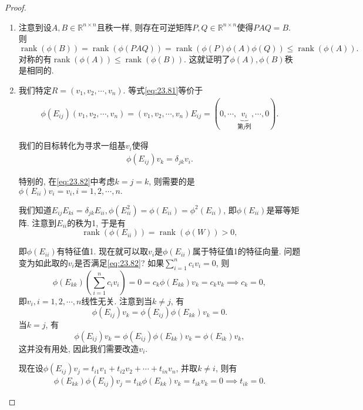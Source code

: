 \documentclass[../../main.tex]{subfiles}
\begin{document}
\begin{proof}
\begin{enumerate}[(1)]
\item 注意到设$A,B \in \mathbb{R}^{n \times n}$且秩一样, 则存在可逆矩阵$P,Q \in \mathbb{R}^{n \times n}$使得$PAQ = B$. 则
$\operatorname{rank}(\phi(B)) = \operatorname{rank}(\phi(PAQ)) = \operatorname{rank}(\phi(P)\phi(A)\phi(Q)) \leq \operatorname{rank}(\phi(A)).$
对称的有$\operatorname{rank}(\phi(A)) \leq \operatorname{rank}(\phi(B))$. 这就证明了$\phi(A),\phi(B)$秩是相同的.

\item 我们特定$R = (v_1,v_2,\cdots,v_n)$. 等式\eqref{eq:23.81}等价于
\begin{align*}
\phi (E_{ij})(v_1,v_2,\cdots ,v_n)=(v_1,v_2,\cdots ,v_n)E_{ij}=\left( 0,\cdots ,\underset{\text{第}j\text{列}}{\underbrace{v_i}},\cdots ,0 \right) .
\end{align*}

我们的目标转化为寻求一组基$v_i$使得
\begin{align}
\phi(E_{ij})v_k = \delta_{jk}v_i. \label{eq:23.82}
\end{align}

特别的, 在\eqref{eq:23.82}中考虑$k = j = k$, 则需要的是
$\phi(E_{ii})v_i = v_i, i = 1,2,\cdots,n.$

我们知道$E_{ij}E_{ki} = \delta_{jk}E_{ii}, \phi(E_{ii}^2) = \phi(E_{ii}) = \phi^2(E_{ii})$, 即$\phi(E_{ii})$是幂等矩阵. 注意到$E_{ii}$的秩为1, 于是有
$$\operatorname{rank}(\phi(E_{ii})) = \operatorname{rank}(\phi(W)) > 0,$$

即$\phi(E_{ii})$有特征值1. 现在就可以取$v_i$是$\phi(E_{ii})$属于特征值1的特征向量. 问题变为如此取的$v_i$是否满足\eqref{eq:23.82}?
如果$\sum_{i=1}^n c_i v_i = 0$, 则
$$\phi(E_{kk})\left(\sum_{i=1}^n c_i v_i\right) = 0 = c_k \phi(E_{kk})v_k = c_k v_k \implies c_k = 0,$$
即$v_i, i = 1,2,\cdots,n$线性无关.
注意到当$k \neq j$, 有
$$\phi(E_{ij})v_k = \phi(E_{ij})\phi(E_{kk})v_k = 0.$$
当$k = j$, 有
$$\phi(E_{ij})v_k = \phi(E_{ij})\phi(E_{kk})v_k = \phi(E_{ik})v_k,$$
这并没有用处, 因此我们需要改造$v_i$.

现在设$\phi(E_{ij})v_j = t_{i1}v_1 + t_{i2}v_2 + \cdots + t_{in}v_n$, 并取$k \neq i$, 则有
$$\phi(E_{kk})\phi(E_{ij})v_j = t_{ik}\phi(E_{kk})v_k = t_{ik}v_k = 0 \implies t_{ik} = 0.$$


\end{enumerate}
\end{proof}
\end{document}
